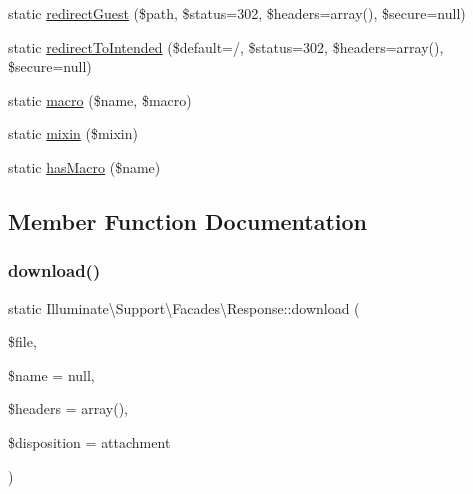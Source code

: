\begin{DoxyCompactItemize}
\item 
static \mbox{\hyperlink{class_illuminate_1_1_support_1_1_facades_1_1_response_a73fcb2d662fbc4c5750385e548f7635d}{redirect\+Guest}} (\$path, \$status=302, \$headers=array(), \$secure=null)
\item 
static \mbox{\hyperlink{class_illuminate_1_1_support_1_1_facades_1_1_response_a75f7f05f8a855eac8f76bb0b93d7f6c0}{redirect\+To\+Intended}} (\$default=\textquotesingle{}/\textquotesingle{}, \$status=302, \$headers=array(), \$secure=null)
\item 
static \mbox{\hyperlink{class_illuminate_1_1_support_1_1_facades_1_1_response_ae12308120a0e244c64181a0111100568}{macro}} (\$name, \$macro)
\item 
static \mbox{\hyperlink{class_illuminate_1_1_support_1_1_facades_1_1_response_a6d0c18c89b5227e2e9ccf6a073a549ea}{mixin}} (\$mixin)
\item 
static \mbox{\hyperlink{class_illuminate_1_1_support_1_1_facades_1_1_response_a83ab61ed5befa2f787536443b466a7f2}{has\+Macro}} (\$name)
\end{DoxyCompactItemize}


\subsection{Member Function Documentation}
\mbox{\label{class_illuminate_1_1_support_1_1_facades_1_1_response_a8496fd2c8b9553a89fde5d7b0faefce3}} 
\subsubsection{\texorpdfstring{download()}{download()}}
{\footnotesize\ttfamily static Illuminate\textbackslash{}\+Support\textbackslash{}\+Facades\textbackslash{}\+Response\+::download (\begin{DoxyParamCaption}\item[{}]{\$file,  }\item[{}]{\$name = {\ttfamily null},  }\item[{}]{\$headers = {\ttfamily array()},  }\item[{}]{\$disposition = {\ttfamily \textquotesingle{}attachment\textquotesingle{}} }\end{DoxyParamCaption})\hspace{0.3cm}{\ttfamily [static]}}

